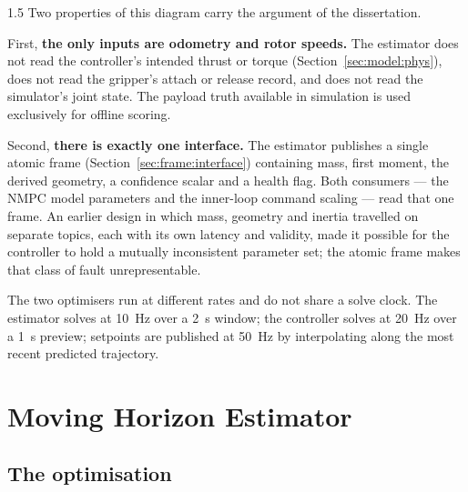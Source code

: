 \begin{spacing}{1.5}
Two properties of this diagram carry the argument of the dissertation.

First, \textbf{the only inputs are odometry and rotor speeds.} The estimator does
not read the controller's intended thrust or torque
(Section~\ref{sec:model:phys}), does not read the gripper's attach or release
record, and does not read the simulator's joint state. The payload truth
available in simulation is used exclusively for offline scoring.

Second, \textbf{there is exactly one interface.} The estimator publishes a single
atomic frame (Section~\ref{sec:frame:interface}) containing mass, first moment,
the derived geometry, a confidence scalar and a health flag. Both consumers ---
the NMPC model parameters and the inner-loop command scaling --- read that one
frame. An earlier design in which mass, geometry and inertia travelled on
separate topics, each with its own latency and validity, made it possible for the
controller to hold a mutually inconsistent parameter set; the atomic frame makes
that class of fault unrepresentable.

The two optimisers run at different rates and do not share a solve clock. The
estimator solves at \SI{10}{\hertz} over a \SI{2}{\second} window; the controller
solves at \SI{20}{\hertz} over a \SI{1}{\second} preview; setpoints are published
at \SI{50}{\hertz} by interpolating along the most recent predicted trajectory.

\section{Moving Horizon Estimator}\label{sec:frame:mhe}

\subsection{The optimisation}\label{sec:frame:mheocp}


\end{spacing}
